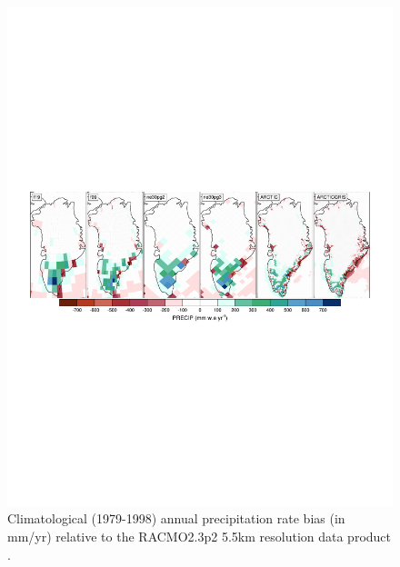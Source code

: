 \documentclass[draft]{agujournal2019}
\begin{document}
\begin{figure}[t]
\begin{center}
         \includegraphics[width=130mm]{figs/temp_diffRACMO23p2_5p5km.pdf}
\end{center}
\caption{Climatological (1979-1998) annual precipitation rate bias (in mm/yr) relative to the RACMO2.3p2 5.5km resolution data product \cite{NETAL2019SCIENCE}.}
\label{fig:prect}
\end{figure}
\end{document}
